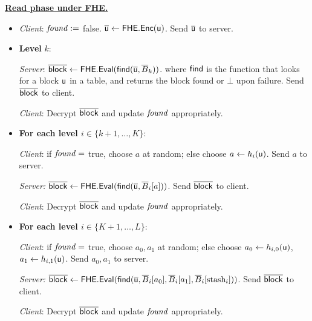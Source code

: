 \noindent\begin{boxedminipage}{\textwidth}
\underline{{\bf Read phase under FHE.}}
\begin{itemize}
\item
{\it Client}: $\mathit{found} := $ false.
$\overline{\textsf{u}} \leftarrow \mathsf{FHE}.{\sf Enc}(\textsf{u})$.
Send $\overline{\textsf{u}}$ to server. 

\item
{\bf Level} $k$:

{\it Server}: 
$\overline{{\sf block}} \leftarrow \mathsf{FHE}.\textsf{Eval}(\mathsf{find}(\overline{\textsf{u}}, \overline{B}_k))$.
where $\mathsf{find}$ is the function that looks for a block $\textsf{u}$
in a table, and returns the block found or $\bot$ upon failure.
Send $\overline{{\sf block}}$ to client.

{\it Client}: 
Decrypt $\overline{{\sf block}}$ and update $\mathit{found}$ appropriately. 


\item
{\bf For each level $i \in \{k+1, \ldots, K\}$}:

{\it Client}: if $\mathit{found} = $ true, choose $a$ at random;
else choose $a \leftarrow h_i(\textsf{u})$.
Send $a$ to server. 

{\it Server:} 
$\overline{{\sf block}} \leftarrow \mathsf{FHE}.\textsf{Eval}(\mathsf{find}(\overline{\textsf{u}}, \overline{B}_i[a]))$.
Send $\overline{{\sf block}}$ to client.

{\it Client}: 
Decrypt $\overline{{\sf block}}$ and update $\mathit{found}$ appropriately. 

\item
{\bf For each level $i \in \{K+1, \ldots, L\}$}:

{\it Client}: if $\mathit{found} = $ true, choose $a_0, a_1$ at random;
else choose $a_0 \leftarrow h_{i,0}(\textsf{u})$,
$a_1 \leftarrow h_{i,1}(\textsf{u})$.
Send $a_0, a_1$ to server. 

{\it Server:} 
$\overline{{\sf block}} 
\leftarrow \mathsf{FHE}.\textsf{Eval}(\mathsf{find}(\overline{\textsf{u}}, \overline{B}_i[a_0], 
\overline{B}_i[a_1], 
\overline{B}_i[\text{stash}_i]))$.
Send $\overline{{\sf block}}$ to client.

{\it Client}: 
Decrypt $\overline{{\sf block}}$ and update $\mathit{found}$ appropriately. 
\end{itemize}
\end{boxedminipage}
\paragraph{}

